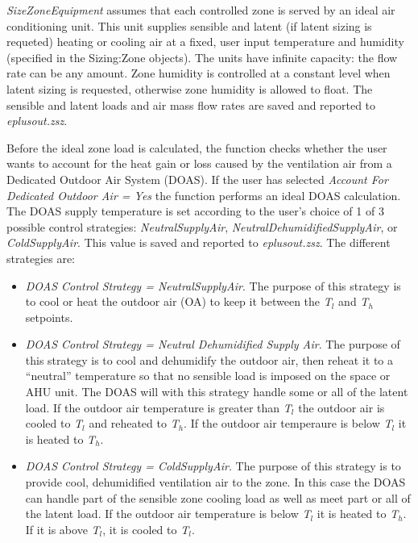 \emph{SizeZoneEquipment} assumes that each controlled zone is served by an ideal air conditioning unit. This unit supplies sensible and latent (if latent sizing is requeted) heating or cooling air at a fixed, user input temperature and humidity (specified in the Sizing:Zone objects). The units have infinite capacity: the flow rate can be any amount. Zone humidity is controlled at a constant level when latent sizing is requested, otherwise zone humidity is allowed to float. The sensible and latent loads and air mass flow rates are saved and reported to \emph{eplusout.zsz}. 

Before the ideal zone load is calculated, the function checks whether the user wants to account for the heat gain or loss caused by the ventilation air from a Dedicated Outdoor Air System (DOAS). If the user has selected \emph{Account For Dedicated Outdoor Air = Yes} the function performs an ideal DOAS calculation. The DOAS supply temperature is set according to the user's choice of 1 of 3 possible control strategies: \emph{NeutralSupplyAir}, \emph{NeutralDehumidifiedSupplyAir}, or \emph{ColdSupplyAir}. This value is saved and reported to \emph{eplusout.zsz}. The different strategies are:

\begin{itemize}
\item
  \emph{DOAS Control Strategy = NeutralSupplyAir}. The purpose of this strategy is to cool or heat the outdoor air (OA) to keep it between the \emph{T\(_{l}\)} and \emph{T\(_{h}\)} setpoints.
\item
  \emph{DOAS Control Strategy = Neutral Dehumidified Supply Air}. The purpose of this strategy is to cool and dehumidify the outdoor air, then reheat it to a ``neutral'' temperature so that no sensible load is imposed on the space or AHU unit. The DOAS will with this strategy handle some or all of the latent load. If the outdoor air temperature is greater than \emph{T\(_{l}\)} the outdoor air is cooled to \emph{T\(_{l}\)} and reheated to \emph{T\(_{h}\)}. If the outdoor air temperaure is below \emph{T\(_{l}\)} it is heated to \emph{T\(_{h}\)}.
\item
  \emph{DOAS Control Strategy = ColdSupplyAir}. The purpose of this strategy is to provide cool, dehumidified ventilation air to the zone. In this case the DOAS can handle part of the sensible zone cooling load as well as meet part or all of the latent load. If the outdoor air temperature is below \emph{T\(_{l}\)} it is heated to \emph{T\(_{h}\)}. If it is above \emph{T\(_{l}\)}, it is cooled to \emph{T\(_{l}\)}.
\end{itemize}


